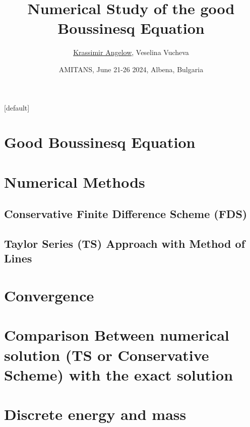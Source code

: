 \documentclass{beamer}
\begin{document}
\title{Numerical Study of the good Boussinesq Equation}

\author[angelow@math.bas.bg]{{\underline{Krassimir Angelow}}, Veselina Vucheva}
\date[2021]{AMITANS, June 21-26  2024,  Albena, Bulgaria}


\begin{frame}
 \titlepage

\end{frame}

\begin{frame}
\tableofcontents 
{}[default]
\section{Good Boussinesq Equation}
\section{Numerical Methods}
\subsection{Conservative Finite Difference Scheme (FDS) }
\subsection{Taylor Series (TS) Approach with Method of Lines }


\section{Convergence}

\section{Comparison Between numerical solution (TS or Conservative Scheme) with the exact solution}

\section{Discrete energy and mass}

\end{frame}
\end{document}
